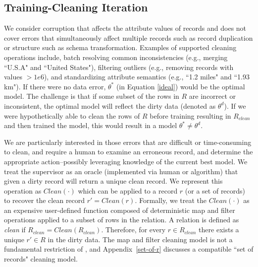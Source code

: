 \subsection{Training-Cleaning Iteration}
We consider corruption that affects the attribute values of records and does not cover errors that simultaneously affect multiple records such as record duplication or structure such as schema transformation.
Examples of supported cleaning operations include, batch resolving common inconsistencies (e.g., merging ``U.S.A" and ``United States"), filtering outliers (e.g., removing records with values $>1e6$), and standardizing attribute semantics (e.g., ``1.2 miles" and ``1.93 km").
If there were no data error, $\theta^{*}$ (in Equation \ref{ideal}) would be the optimal model.
The challenge is that if some subset of the rows in $R$ are incorrect or inconsistent, the optimal model will reflect the dirty data (denoted as $\theta^{d}$).
If we were hypothetically able to clean the rows of $R$ before training resulting in $R_{clean}$ and then trained the model, this would result in a model $\theta^{*} \ne \theta^{d}$.

We are particularly interested in those errors that are difficult or time-consuming to clean, and require a human to examine an erroneous record, and determine the appropriate action--possibly leveraging knowledge of the current best model.
We treat the supervisor as an oracle (implemented via human or algorithm) that given a dirty record will return a unique clean record.
We represent this operation as $Clean(\cdot)$ which can be applied to a record $r$ (or a set of records) to recover the clean record $r' = Clean(r)$.
Formally, we treat the $Clean(\cdot)$ as an expensive user-defined function composed of deterministic \textsf{map} and \textsf{filter} operations applied to a subset of rows in the relation.
A relation is defined as \emph{clean} if $R_{clean} = Clean(R_{clean})$.
Therefore, for every $r \in R_{clean}$ there exists a unique $r' \in R$ in the dirty data.
The \textsf{map} and \textsf{filter} cleaning model is not a fundamental restriction of \sys, and Appendix~\ref{set-of-r} discusses a compatible ``set of records" cleaning model.

